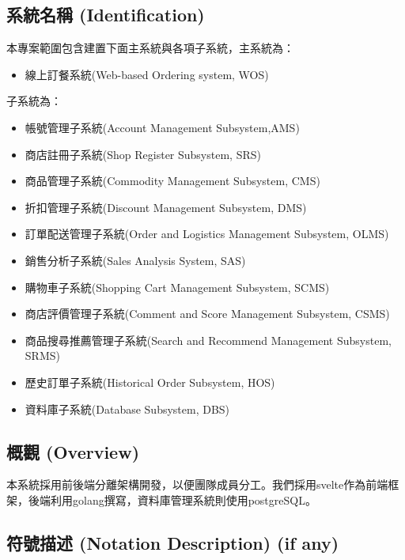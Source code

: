 \documentclass[a4paper, 12pt]{article}
\begin{document}
\subsection{系統名稱 (Identification)}

\noindent 本專案範圍包含建置下面主系統與各項子系統，主系統為：

\begin{itemize}
  \item 線上訂餐系統(Web-based Ordering system, WOS)
\end{itemize}

\noindent 子系統為：

\begin{itemize}

  \item 帳號管理子系統(Account Management Subsystem,AMS)
  \item 商店註冊子系統(Shop Register Subsystem, SRS)
  \item 商品管理子系統(Commodity Management Subsystem, CMS)
  \item 折扣管理子系統(Discount Management Subsystem, DMS)
  \item 訂單配送管理子系統(Order and Logistics Management Subsystem, OLMS)
  \item 銷售分析子系統(Sales Analysis System, SAS)
  \item 購物車子系統(Shopping Cart Management Subsystem, SCMS)
  \item 商店評價管理子系統(Comment and Score Management Subsystem, CSMS)
  \item 商品搜尋推薦管理子系統(Search and Recommend Management Subsystem,
SRMS)
  \item 歷史訂單子系統(Historical Order Subsystem, HOS)

  \item 資料庫子系統(Database Subsystem, DBS)

\end{itemize}


\subsection{概觀 (Overview)}

本系統採用前後端分離架構開發，以便團隊成員分工。我們採用svelte作為前端框架，後端利用golang撰寫，資料庫管理系統則使用postgreSQL。


\subsection{符號描述 (Notation Description) (if any)}
\end{document}
